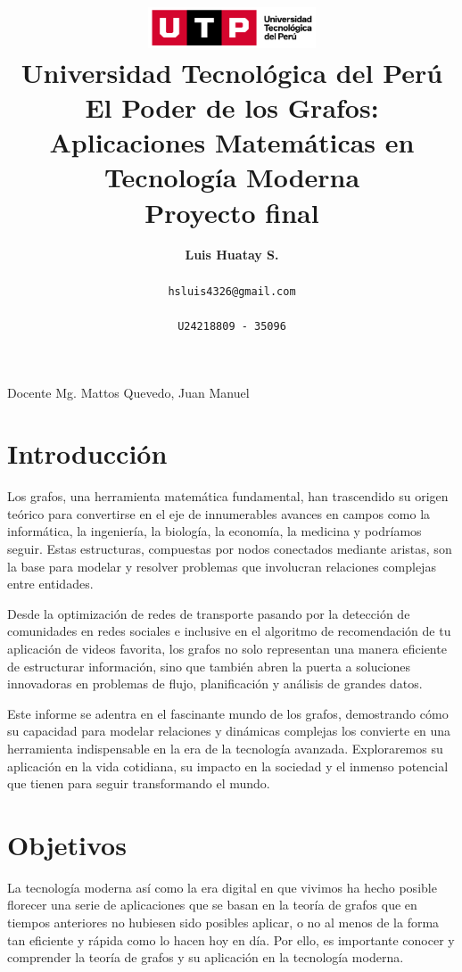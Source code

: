 \documentclass[11pt, a4paper]{article}
\title{
  \includegraphics[width=5cm]{./assets/logo-utp.png} \\
  \vspace{1cm}
  \textbf{Universidad Tecnológica del Perú} \\
  \vspace{3.5cm}
  \textbf{El Poder de los Grafos: Aplicaciones Matemáticas en Tecnología Moderna} \\ 
  \vspace{1cm}
  \large \textbf{Proyecto final}
}
\author{\textbf{Luis Huatay S.}\\\\\texttt{hsluis4326@gmail.com}\\\\\texttt{U24218809 - 35096}}
\begin{document}
\maketitle
\thispagestyle{empty}
\begin{center}
Docente Mg. Mattos Quevedo, Juan Manuel
\end{center}
\restoregeometry

\newpage 

\tableofcontents

\newpage
\vspace*{\fill}
\section{Introducción}

Los grafos, una herramienta matemática fundamental, han trascendido su origen teórico para convertirse en el eje de innumerables avances en campos como la informática, la ingeniería, la biología, la economía, la medicina y podríamos seguir. Estas estructuras, compuestas por nodos conectados mediante aristas, son la base para modelar y resolver problemas que involucran relaciones complejas entre entidades.

Desde la optimización de redes de transporte pasando por la detección de comunidades en redes sociales e inclusive en el algoritmo de recomendación de tu aplicación de videos favorita, los grafos no solo representan una manera eficiente de estructurar información, sino que también abren la puerta a soluciones innovadoras en problemas de flujo, planificación y análisis de grandes datos.

Este informe se adentra en el fascinante mundo de los grafos, demostrando cómo su capacidad para modelar relaciones y dinámicas complejas los convierte en una herramienta indispensable en la era de la tecnología avanzada. Exploraremos su aplicación en la vida cotidiana, su impacto en la sociedad y el inmenso potencial que tienen para seguir transformando el mundo.

  
\vspace*{\fill}

\newpage

\section{Objetivos}

  La tecnología moderna así como la era digital en que vivimos ha hecho posible florecer una serie de aplicaciones que se basan en la teoría de grafos que en tiempos anteriores no hubiesen sido posibles aplicar, o no al menos de la forma tan eficiente y rápida como lo hacen hoy en día. Por ello, es importante conocer y comprender la teoría de grafos y su aplicación en la tecnología moderna.
\end{document}
